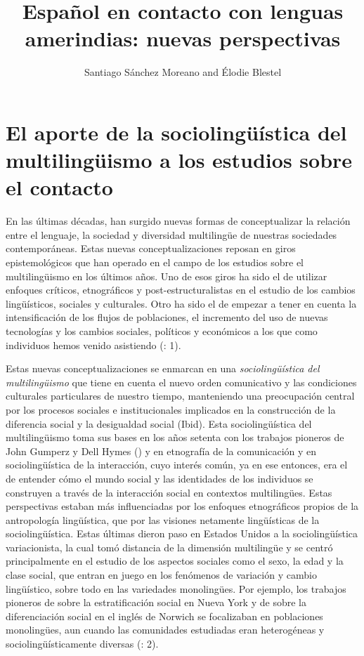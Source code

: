\documentclass[output=paper]{langscibook}
\author{Santiago Sánchez Moreano\orcid{0000-0002-8434-3726}\affiliation{The Open University} and Élodie Blestel\orcid{0000-0001-7257-6859}\affiliation{Université Sorbonne Nouvelle}}
\title{Español en contacto con lenguas amerindias: nuevas perspectivas}
\begin{document}
\maketitle 

 
 
\section{El aporte de la sociolingüística del multilingüismo a los estudios sobre el contacto}

En las últimas décadas, han surgido nuevas formas de conceptualizar la relación entre el lenguaje, la sociedad y diversidad multilingüe de nuestras sociedades contemporáneas. Estas nuevas conceptualizaciones reposan en giros epistemológicos que han operado en el campo de los estudios sobre el multilingüismo en los últimos años. Uno de esos giros ha sido el de utilizar enfoques críticos, etnográficos y post-estructuralistas en el estudio de los cambios lingüísticos, sociales y culturales. Otro ha sido el de empezar a tener en cuenta la intensificación de los flujos de poblaciones, el incremento del uso de nuevas tecnologías y los cambios sociales, políticos y económicos a los que como individuos hemos venido asistiendo (\citealt{Martin-JonesMartin2017}: 1).

Estas nuevas conceptualizaciones se enmarcan en una \textit{sociolingüística del multilingüismo} que tiene en cuenta el nuevo orden comunicativo y las condiciones culturales particulares de nuestro tiempo, manteniendo una preocupación central por los procesos sociales e institucionales implicados en la construcción de la diferencia social y la desigualdad social (Ibid). Esta sociolingüística del multilingüismo toma sus bases en los años setenta con los trabajos pioneros de John Gumperz y Dell Hymes (\citeyear{GumperzHymes1972}) y \citet{Hymes1974} en etnografía de la comunicación y en sociolingüística de la interacción, cuyo interés común, ya en ese entonces, era el de entender cómo el mundo social y las identidades de los individuos se construyen a través de la interacción social en contextos multilingües. Estas perspectivas estaban más influenciadas por los enfoques etnográficos propios de la antropología lingüística, que por las visiones netamente lingüísticas de la sociolingüística. Estas últimas dieron paso en Estados Unidos a la sociolingüística variacionista, la cual tomó distancia de la dimensión multilingüe y se centró principalmente en el estudio de los aspectos sociales como el sexo, la edad y la clase social, que entran en juego en los fenómenos de variación y cambio lingüístico, sobre todo en las variedades monolingües. Por ejemplo, los trabajos pioneros de \citet{Labov1966,Labov1972transformation} sobre la estratificación social en Nueva York y de \citet{Trudgill1974} sobre la diferenciación social en el inglés de Norwich se focalizaban en poblaciones monolingües, aun cuando las comunidades estudiadas eran heterogéneas y sociolingüísticamente diversas (\citealt{LégliseChamoreau2013}: 2).
\end{document}
